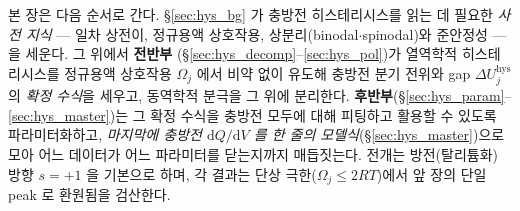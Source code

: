 \documentclass[11pt,a4paper]{article}
\newcommand{\dd}{\mathrm{d}}
\newcommand{\hys}{\mathrm{hys}}
\begin{document}
본 장은 다음 순서로 간다. \S\ref{sec:hys_bg} 가 충방전 히스테리시스를 읽는 데 필요한 \emph{사전 지식} — 일차
상전이, 정규용액 상호작용, 상분리(binodal$\cdot$spinodal)와 준안정성 — 을 세운다. 그 위에서 \textbf{전반부}
(\S\ref{sec:hys_decomp}--\ref{sec:hys_pol})가 열역학적 히스테리시스를 정규용액 상호작용 $\Omega_j$ 에서 비약
없이 유도해 충방전 분기 전위와 gap $\Delta U_j^\hys$ 의 \emph{확정 수식}을 세우고, 동역학적 분극을 그 위에
분리한다. \textbf{후반부}(\S\ref{sec:hys_param}--\ref{sec:hys_master})는 그 확정 수식을 충방전 모두에 대해 피팅하고
활용할 수 있도록 파라미터화하고, \emph{마지막에 충방전 $\dd Q/\dd V$ 를 한 줄의 모델식}(\S\ref{sec:hys_master})으로
모아 어느 데이터가 어느 파라미터를 닫는지까지 매듭짓는다. 전개는 방전(탈리튬화) 방향 $s=+1$ 을 기본으로 하며, 각
결과는 단상 극한($\Omega_j\le2RT$)에서 앞 장의 단일 peak 로 환원됨을 검산한다.

\tableofcontents
\newpage

\end{document}
